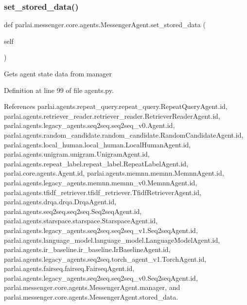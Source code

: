 \subsubsection{\texorpdfstring{set\+\_\+stored\+\_\+data()}{set\_stored\_data()}}
{\footnotesize\ttfamily def parlai.\+messenger.\+core.\+agents.\+Messenger\+Agent.\+set\+\_\+stored\+\_\+data (\begin{DoxyParamCaption}\item[{}]{self }\end{DoxyParamCaption})}

\begin{DoxyVerb}Gets agent state data from manager\end{DoxyVerb}
 

Definition at line 99 of file agents.\+py.



References parlai.\+agents.\+repeat\+\_\+query.\+repeat\+\_\+query.\+Repeat\+Query\+Agent.\+id, parlai.\+agents.\+retriever\+\_\+reader.\+retriever\+\_\+reader.\+Retriever\+Reader\+Agent.\+id, parlai.\+agents.\+legacy\+\_\+agents.\+seq2seq.\+seq2seq\+\_\+v0.\+Agent.\+id, parlai.\+agents.\+random\+\_\+candidate.\+random\+\_\+candidate.\+Random\+Candidate\+Agent.\+id, parlai.\+agents.\+local\+\_\+human.\+local\+\_\+human.\+Local\+Human\+Agent.\+id, parlai.\+agents.\+unigram.\+unigram.\+Unigram\+Agent.\+id, parlai.\+agents.\+repeat\+\_\+label.\+repeat\+\_\+label.\+Repeat\+Label\+Agent.\+id, parlai.\+core.\+agents.\+Agent.\+id, parlai.\+agents.\+memnn.\+memnn.\+Memnn\+Agent.\+id, parlai.\+agents.\+legacy\+\_\+agents.\+memnn.\+memnn\+\_\+v0.\+Memnn\+Agent.\+id, parlai.\+agents.\+tfidf\+\_\+retriever.\+tfidf\+\_\+retriever.\+Tfidf\+Retriever\+Agent.\+id, parlai.\+agents.\+drqa.\+drqa.\+Drqa\+Agent.\+id, parlai.\+agents.\+seq2seq.\+seq2seq.\+Seq2seq\+Agent.\+id, parlai.\+agents.\+starspace.\+starspace.\+Starspace\+Agent.\+id, parlai.\+agents.\+legacy\+\_\+agents.\+seq2seq.\+seq2seq\+\_\+v1.\+Seq2seq\+Agent.\+id, parlai.\+agents.\+language\+\_\+model.\+language\+\_\+model.\+Language\+Model\+Agent.\+id, parlai.\+agents.\+ir\+\_\+baseline.\+ir\+\_\+baseline.\+Ir\+Baseline\+Agent.\+id, parlai.\+agents.\+legacy\+\_\+agents.\+seq2seq.\+torch\+\_\+agent\+\_\+v1.\+Torch\+Agent.\+id, parlai.\+agents.\+fairseq.\+fairseq.\+Fairseq\+Agent.\+id, parlai.\+agents.\+legacy\+\_\+agents.\+seq2seq.\+seq2seq\+\_\+v0.\+Seq2seq\+Agent.\+id, parlai.\+messenger.\+core.\+agents.\+Messenger\+Agent.\+manager, and parlai.\+messenger.\+core.\+agents.\+Messenger\+Agent.\+stored\+\_\+data.


